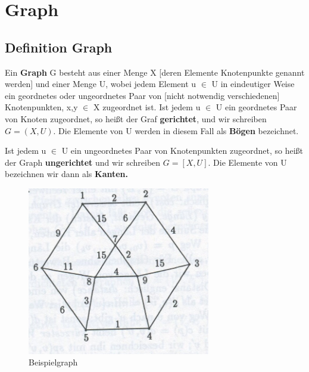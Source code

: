 
\chapter{Graph}

\section{Definition Graph}


\begin{theorem}
Ein \textbf{Graph} G besteht aus einer Menge X [deren Elemente Knotenpunkte genannt werden] und einer Menge U, wobei jedem Element u $\in$ U in eindeutiger Weise ein geordnetes oder ungeordnetes Paar von [nicht notwendig verschiedenen] Knotenpunkten, x,y $\in$ X zugeordnet ist.
Ist jedem u $\in$ U ein geordnetes Paar von Knoten zugeordnet, so heißt der Graf \textbf{gerichtet}, und wir schreiben 
	$G= (X, U)$.
Die Elemente von U werden in diesem Fall als \textbf{Bögen} bezeichnet.

Ist jedem u $\in$ U ein ungeordnetes Paar von Knotenpunkten zugeordnet, so heißt der Graph \textbf{ungerichtet} und wir schreiben 
	$G=[X,U]$. 
Die Elemente von U bezeichnen wir dann als \textbf{Kanten.} \\
\cite[S. 9]{Biess09} 	%
\end{theorem} 

\begin{figure}[h]
\centering
\includegraphics[width = 8cm]{./chapters/Graph.jpg}
\caption{Beispielgraph \cite[S.572 Abb. 8.18]{OttWid90}
}
\label{a1}
\end{figure}



